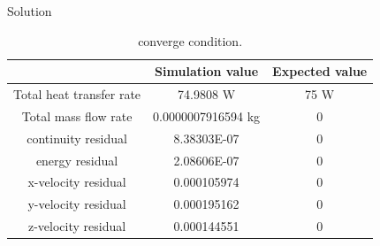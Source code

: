 \documentclass[10pt, xcolor=table]{beamer}
\begin{document}
\begin{frame}{Solution}
	\begin{table}[]
		\begin{tabular}{|c|c|c|}
		\hline
		\multicolumn{1}{|l|}{}   & Simulation value   & Expected value \\ \hline
		Total heat transfer rate & 74.9808 W          & 75 W           \\ \hline
		Total mass flow rate     & 0.0000007916594 kg & 0              \\ \hline
		continuity residual      & 8.38303E-07        & 0              \\ \hline
		energy residual          & 2.08606E-07        & 0              \\ \hline
		x-velocity residual      & 0.000105974        & 0              \\ \hline
		y-velocity residual      & 0.000195162        & 0              \\ \hline
		z-velocity residual      & 0.000144551        & 0              \\ \hline
		\end{tabular}
		\caption{converge condition.}
		\end{table}	

\end{frame}
\end{document}
